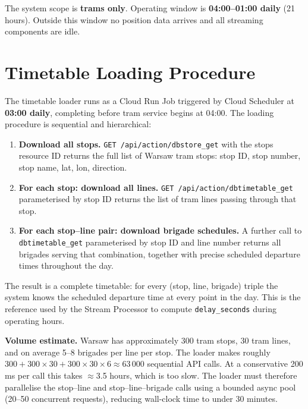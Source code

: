 \documentclass[11pt,a4paper]{article}
\begin{document}
The system scope is \textbf{trams only}. Operating window is
\textbf{04:00--01:00 daily} (21 hours). Outside this window no position data
arrives and all streaming components are idle.

\section{Timetable Loading Procedure}
\label{sec:timetable}

The timetable loader runs as a Cloud Run Job triggered by Cloud Scheduler at
\textbf{03:00 daily}, completing before tram service begins at 04:00. The
loading procedure is sequential and hierarchical:

\begin{enumerate}[itemsep=4pt]
  \item \textbf{Download all stops.}
    \texttt{GET /api/action/dbstore\_get} with the stops resource ID returns
    the full list of Warsaw tram stops: stop ID, stop number, stop name, lat,
    lon, direction.

  \item \textbf{For each stop: download all lines.}
    \texttt{GET /api/action/dbtimetable\_get} parameterised by stop ID returns
    the list of tram lines passing through that stop.

  \item \textbf{For each stop--line pair: download brigade schedules.}
    A further call to \texttt{dbtimetable\_get} parameterised by stop ID and
    line number returns all brigades serving that combination, together with
    precise scheduled departure times throughout the day.
\end{enumerate}

The result is a complete timetable: for every
(stop, line, brigade) triple the system knows the scheduled departure time at
every point in the day. This is the reference used by the Stream Processor to
compute \texttt{delay\_seconds} during operating hours.

\textbf{Volume estimate.} Warsaw has approximately 300 tram stops, 30 tram
lines, and on average 5--8 brigades per line per stop. The loader makes
roughly $300 + 300 \times 30 + 300 \times 30 \times 6 \approx 63\,000$
sequential API calls. At a conservative 200 ms per call this takes
$\approx$3.5 hours, which is too slow. The loader must therefore parallelise
the stop--line and stop--line--brigade calls using a bounded async pool
(20--50 concurrent requests), reducing wall-clock time to under 30 minutes.
\end{document}
